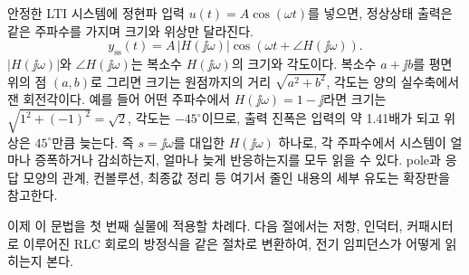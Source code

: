 안정한 LTI 시스템에 정현파 입력 $u(t)=A\cos(\omega t)$를 넣으면, 정상상태
출력은 같은 주파수를 가지며 크기와 위상만 달라진다.
\begin{equation}
  y_{\mathrm{ss}}(t)
  = A\,|H(\jj\omega)|\cos\!\left(\omega t + \angle H(\jj\omega)\right).
\end{equation}
$|H(\jj\omega)|$와 $\angle H(\jj\omega)$는 복소수 $H(\jj\omega)$의 크기와
각도이다.
복소수 $a+\jj b$를 평면 위의 점 $(a,b)$로 그리면 크기는 원점까지의 거리
$\sqrt{a^2+b^2}$, 각도는 양의 실수축에서 잰 회전각이다.
예를 들어 어떤 주파수에서 $H(\jj\omega)=1-\jj$라면 크기는
$\sqrt{1^2+(-1)^2}=\sqrt{2}$, 각도는 $-45^\circ$이므로, 출력 진폭은 입력의
약 1.41배가 되고 위상은 $45^\circ$만큼 늦는다.
즉 $s=\jj\omega$를 대입한 $H(\jj\omega)$ 하나로, 각 주파수에서 시스템이
얼마나 증폭하거나 감쇠하는지, 얼마나 늦게 반응하는지를 모두 읽을 수 있다.
pole과 응답 모양의 관계, 컨볼루션, 최종값 정리 등 여기서 줄인 내용의 세부
유도는 확장판을 참고한다.

이제 이 문법을 첫 번째 실물에 적용할 차례다.
다음 절에서는 저항, 인덕터, 커패시터로 이루어진 RLC 회로의 방정식을 같은
절차로 변환하여, 전기 임피던스가 어떻게 읽히는지 본다.
